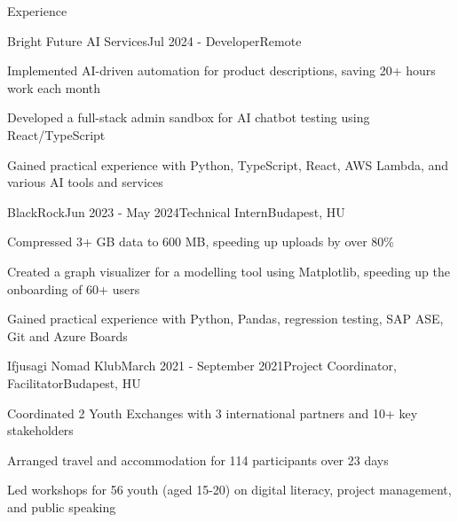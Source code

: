 \documentclass[
	a4paper, %
	11pt, %
]{resume} %
\begin{document}
\begin{rSection}{Experience}

	\begin{rSubsection}{Bright Future AI Services}{Jul 2024 - }{Developer}{Remote}
		\item Implemented AI-driven automation for product descriptions, saving 20+ hours work each month
		\item Developed a full-stack admin sandbox for AI chatbot testing using React/TypeScript
		\item Gained practical experience with Python, TypeScript, React, AWS Lambda, and various AI tools and services
	\end{rSubsection}

	\begin{rSubsection}{BlackRock}{Jun 2023 - May 2024}{Technical Intern}{Budapest, HU}
		\item Compressed 3+ GB data to 600 MB, speeding up uploads by over 80\%
		\item Created a graph visualizer for a modelling tool using Matplotlib, speeding up the onboarding of 60+ users
		\item Gained practical experience with Python, Pandas, regression testing, SAP ASE, Git and Azure Boards
	\end{rSubsection}

	\begin{rSubsection}{Ifjusagi Nomad Klub}{March 2021 - September 2021}{Project Coordinator, Facilitator}{Budapest, HU}
		\item Coordinated 2 Youth Exchanges with 3 international partners and 10+ key stakeholders
		\item Arranged travel and accommodation for 114 participants over 23 days
		\item Led workshops for 56 youth (aged 15-20) on digital literacy, project management, and public speaking
	\end{rSubsection}

\end{rSection}

\end{document}

